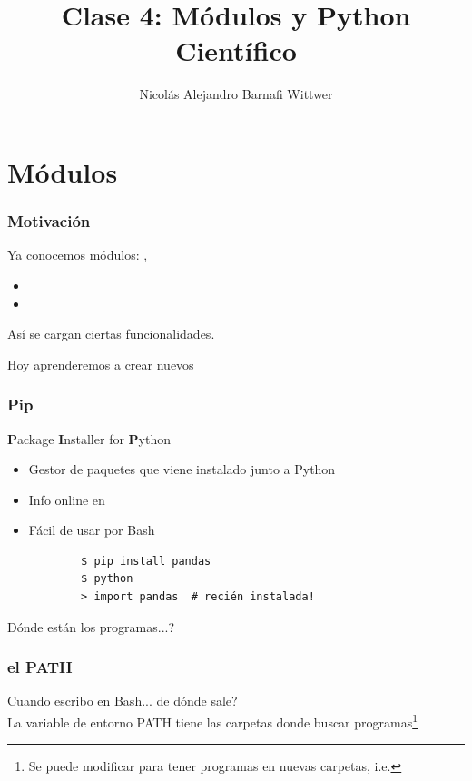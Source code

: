 \documentclass[14pt,aspectratio=169,xcolor=dvipsnames]{beamer}
\title[short title]{Clase 4: Módulos y Python Científico}
\subtitle{}
\author[NA Barnafi] {Nicolás Alejandro Barnafi Wittwer}
\institute[UC|CMM] 
{
    Pontificia Universidad Católica de Chile \\
    Centro de Modelamiento Matemático
}
\date{}
\begin{document}
\begin{frame}
    \maketitle
\end{frame}
\section{Módulos}
\begin{frame}[fragile]\frametitle{Motivación}
    Ya conocemos módulos: , 
    \begin{itemize}
        \item {}
        \item {}
    \end{itemize}
    Así se cargan ciertas funcionalidades. 

    \pause Hoy aprenderemos a crear nuevos
\end{frame}
\begin{frame}[fragile]\frametitle{Pip}
    \textbf{P}ackage \textbf{I}nstaller for \textbf{P}ython
    
    \begin{itemize}
        \item Gestor de paquetes que viene instalado junto a Python
        \item Info online en 
        \item Fácil de usar por Bash
            \begin{verbatim}
        $ pip install pandas
        $ python
        > import pandas  # recién instalada!
            \end{verbatim}
    \end{itemize}
    
    \pause Dónde están los programas...?
\end{frame}
\begin{frame}\frametitle{el PATH}
    Cuando escribo  en Bash... de dónde sale? \\

    \vspace{0.5cm}
    La variable de entorno PATH tiene las carpetas donde buscar programas\footnote{Se puede modificar para tener programas en nuevas carpetas, i.e. }

    \pause {}
\end{frame}
\end{document}
